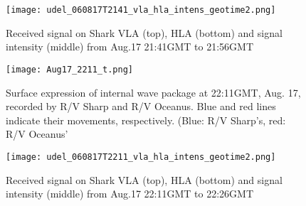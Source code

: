 
\begin{figure}[H]
  \centering
  \texttt{[image: udel\_060817T2141\_vla\_hla\_intens\_geotime2.png]}
  \caption{Received signal on Shark VLA (top), HLA (bottom) and signal intensity (middle) from Aug.17 21:41GMT to 21:56GMT }\label{fig:a2141}
\end{figure}



\begin{figure}[H]
  \centering
  \texttt{[image: Aug17\_2211\_t.png]}
  \caption{Surface expression of internal wave package at 22:11GMT, Aug. 17, recorded by R/V Sharp and R/V Oceanus. Blue and red lines indicate their movements, respectively. (Blue: R/V Sharp's, red: R/V Oceanus'}\label{fig:r2211_r}
\end{figure}


\begin{figure}[H]
  \centering
  \texttt{[image: udel\_060817T2211\_vla\_hla\_intens\_geotime2.png]}
  \caption{Received signal on Shark VLA (top), HLA (bottom) and signal intensity (middle) from Aug.17 22:11GMT to 22:26GMT }\label{fig:a2211}
\end{figure}




